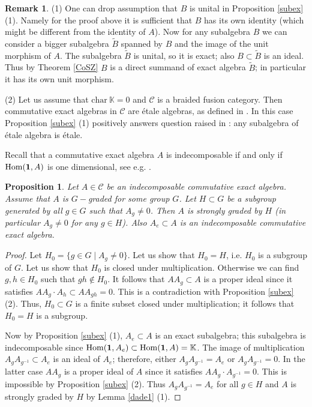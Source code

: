 \documentclass{amsart}
\newtheorem{proposition}[theorem]{Proposition}
\theoremstyle{definition}
\newtheorem{remark}[theorem]{Remark}
\newcommand{\C}{\mathcal{C}}
\newcommand{\K}{\mathbb{K}}
\newcommand{\Hom}{\mathrm{Hom}}
\newcommand{\be}{{\bf 1}}
\numberwithin{equation}{section}
\begin{document}
\begin{remark}
    (1) One can drop assumption that $B$ is unital in Proposition \ref{subex} (1).
    Namely for the proof above it is sufficient that $B$ has its own identity (which
    might be different from the identity of $A$). Now for any subalgebra $B$ we can
    consider a bigger subalgebra $\tilde B$ spanned by $B$ and the image of the unit
    morphism of $A$. The subalgebra $\tilde B$ is unital, so it is exact; also $B\subset \tilde B$
    is an ideal. Thus by Theorem \ref{CoSZ} $B$ is a direct summand of exact algebra $\tilde B$;
    in particular it has its own unit morphism. 

    (2) Let us assume that $\mbox{char}~ \K=0$ and $\C$ is a braided fusion category. Then commutative exact algebras in $\C$ are \'etale algebras, as defined in \cite[Definition 3.1]{DMNO}.
    In this case Proposition \ref{subex} (1) positively answers question raised
    in \cite[Remark 3.4]{DNO}: any subalgebra of \'etale algebra is \'etale.
\end{remark}

Recall that a commutative exact algebra $A$ is indecomposable if and only if
$\Hom(\be,A)$ is one dimensional, see e.g. \cite[Lemma 5.8]{ShYa}.

\begin{proposition}\label{exstr}
    Let $A\in \C$ be an indecomposable commutative exact algebra. Assume that $A$ is
    $G-$graded for some group $G$. Let $H\subset G$ be a subgroup generated by all
    $g\in G$ such that $A_g\ne 0$. Then $A$ is strongly graded by $H$ (in particular
    $A_g\ne 0$ for any $g\in H$). Also $A_e\subset A$ is an indecomposable commutative exact
    algebra.
\end{proposition}

\begin{proof}
    Let $H_0=\{ g\in G\; |\; A_g\ne 0\}$. Let us show that $H_0=H$, i.e. $H_0$ is a subgroup
    of $G$. Let us show that $H_0$ is closed under multiplication. 
    Otherwise we can find $g,h\in H_0$ such that $gh\not \in H_0$. It follows
    that $AA_g\subset A$ is a proper ideal since it satisfies $AA_g\cdot A_h\subset AA_{gh}=0$.
    This is a contradiction with Proposition \ref{subex} (2). Thus, $H_0\subset G$ is a finite
    subset closed under multiplication; it follows that $H_0=H$ is a subgroup.

    Now by Proposition \ref{subex} (1), $A_e\subset A$ is an exact subalgebra; this subalgebra
    is indecomposable since $\Hom(\be,A_e)\subset \Hom(\be,A)=\K$. The image of multiplication
    $A_gA_{g^{-1}}\subset A_e$ is an ideal of $A_e$; therefore, either $A_gA_{g^{-1}}=A_e$ or
    $A_gA_{g^{-1}}=0$. In the latter case $AA_g$ is a proper ideal of $A$ since it satisfies
    $AA_g\cdot A_{g^{-1}}=0$. This is impossible by Proposition \ref{subex} (2).
    Thus $A_gA_{g^{-1}}=A_e$ for all $g\in H$ and $A$ is strongly graded by $H$ by 
    Lemma \ref{dade1} (1).
\end{proof}
\end{document}
